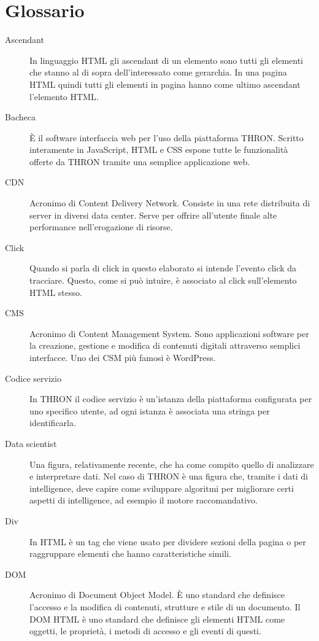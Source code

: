 \documentclass[a4paper, 12pt, twoside, openright]{book}
\begin{document}
\chapter{Glossario}
\begin {description}

\item[Ascendant]
In linguaggio HTML gli ascendant di un elemento sono tutti gli elementi che stanno al di sopra dell'interessato come gerarchia. In una pagina HTML quindi tutti gli elementi in pagina hanno come ultimo ascendant l'elemento HTML.

\item[Bacheca]
\`{E} il software interfaccia web per l'uso della piattaforma THRON. Scritto interamente in JavaScript, HTML e CSS espone tutte le funzionalità offerte da THRON tramite una semplice applicazione web.\\

\item[CDN]
Acronimo di Content Delivery Network. Consiste in una rete distribuita di server in diversi data center. Serve per offrire all'utente finale alte performance nell'erogazione di risorse.
\item[Click]
Quando si parla di click in questo elaborato si intende l'evento click da tracciare. Questo, come si può intuire, è associato al click sull'elemento HTML stesso.
\item[CMS]
Acronimo di Content Management System. Sono applicazioni software per la creazione, gestione e modifica di contenuti digitali attraverso semplici interfacce. Uno dei CSM più famosi è WordPress.
\item[Codice servizio]
In THRON il codice servizio è un'istanza della piattaforma configurata per uno specifico utente, ad ogni istanza è associata una stringa per identificarla.

\item[Data scientist]
Una figura, relativamente recente, che ha come compito quello di analizzare e interpretare dati. Nel caso di THRON è una figura che, tramite i dati di intelligence, deve capire come sviluppare algoritmi per migliorare certi aspetti di intelligence, ad esempio il motore raccomandativo.
\item[Div]
In HTML è un tag che viene usato per dividere sezioni della pagina o per raggruppare elementi che hanno caratteristiche simili.
\item[DOM]
Acronimo di Document Object Model. \`{E} uno standard che definisce l'accesso e la modifica di contenuti, strutture e stile di un documento. Il DOM HTML è uno standard che definisce gli elementi HTML come oggetti, le proprietà, i metodi di accesso e gli eventi di questi.


\end{description}
\end{document}
